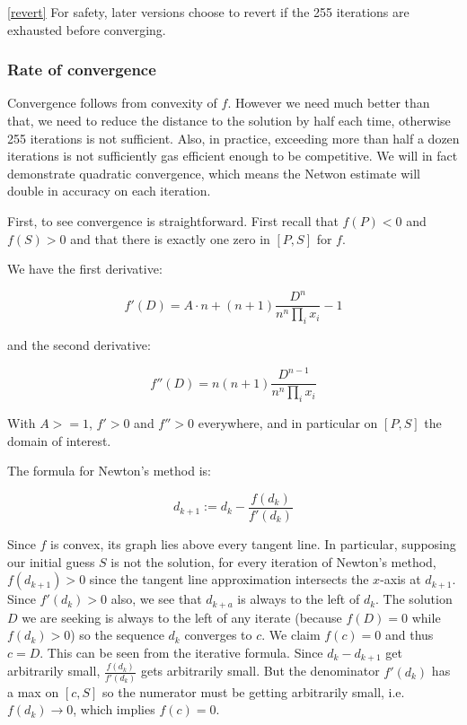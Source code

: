 \documentclass[
]{article}
\begin{document}
\ref{revert} For safety, later versions choose to revert if the 255
iterations are exhausted before converging.

\hypertarget{rate-of-convergence}{%
\subsubsection{Rate of convergence}\label{rate-of-convergence}}

Convergence follows from convexity of \(f\). However we need much better
than that, we need to reduce the distance to the solution by half each
time, otherwise 255 iterations is not sufficient. Also, in practice,
exceeding more than half a dozen iterations is not sufficiently gas
efficient enough to be competitive. We will in fact demonstrate
quadratic convergence, which means the Netwon estimate will double in
accuracy on each iteration.

First, to see convergence is straightforward. First recall that
\(f(P) < 0\) and \(f(S) > 0\) and that there is exactly one zero in
\([P, S]\) for \(f\).

We have the first derivative:

\[ f'(D) = A\cdot n + (n+1) \frac{D^n}{n^n \prod_i x_i} - 1 \]

and the second derivative:

\[ f''(D) = n (n+1) \frac{D^{n-1}}{n^n \prod_i x_i} \]

With \(A >= 1\), \(f' > 0\) and \(f'' > 0\) everywhere, and in
particular on \([P, S]\) the domain of interest.

The formula for Newton's method is:

\[ d_{k+1} := d_k - \frac{f(d_k)}{f'(d_k)} \]

Since \(f\) is convex, its graph lies above every tangent line. In
particular, supposing our initial guess \(S\) is not the solution, for
every iteration of Newton's method, \(f(d_{k+1}) > 0\) since the tangent
line approximation intersects the \(x\)-axis at \(d_{k+1}\). Since
\(f'(d_k) > 0\) also, we see that \(d_{k+a}\) is always to the left of
\(d_k\). The solution \(D\) we are seeking is always to the left of any
iterate (because \(f(D) = 0\) while \(f(d_k) > 0\)) so the sequence
\(d_k\) converges to \(c\). We claim \(f(c) = 0\) and thus \(c = D\).
This can be seen from the iterative formula. Since \(d_{k} - d_{k+1}\)
get arbitrarily small, \(\frac{f(d_k)}{f'(d_k)}\) gets arbitrarily
small. But the denominator \(f'(d_k)\) has a max on \([c, S]\) so the
numerator must be getting arbitrarily small,
i.e.~\(f(d_k) \rightarrow 0\), which implies \(f(c) = 0\).
\end{document}
